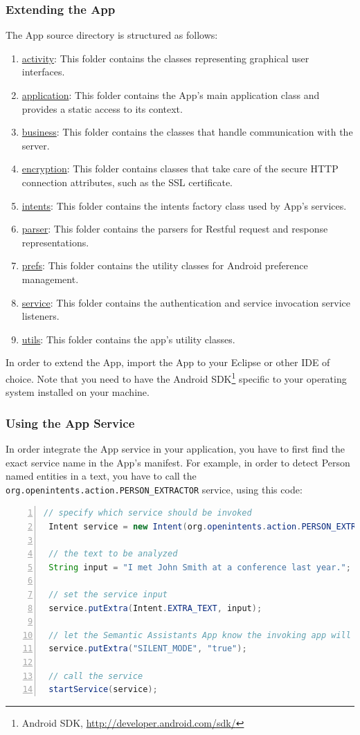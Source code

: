 \subsubsection{Extending the \sa App}
The \sa App source directory is structured as follows:
\begin{enumerate}
\item\url{activity}: This folder contains the classes representing graphical user interfaces.
\item\url{application}: This folder contains the \sa App's main application class and provides a static access to its context.
\item\url{business}: This folder contains the classes that handle communication with the \sa server.
\item\url{encryption}: This folder contains classes that take care of the secure HTTP connection attributes, such as the SSL certificate.
\item\url{intents}: This folder contains the intents factory class used by \sa App's services.
\item\url{parser}: This folder contains the parsers for Restful request and response representations.
\item\url{prefs}: This folder contains the utility classes for Android preference management.
\item\url{service}: This folder contains the authentication and service invocation service listeners.
\item\url{utils}: This folder contains the app's utility classes.
\end{enumerate}

In order to extend the \sa App, import the \sa App to your Eclipse or other IDE of choice. Note that you need to have the Android SDK\footnote{Android SDK, \url{http://developer.android.com/sdk/}} specific to your operating system installed on your machine.

\subsubsection{Using the \sa App Service}
In order integrate the \sa App service in your application, you have to first find the exact service name in the \sa App's manifest. For example, in order to detect Person named entities in a text, you have to call the \texttt{org.openintents.action.PERSON\_EXTRACTOR} service, using this code:

\begin{lstlisting}[language=Java,numbers=left,xleftmargin=4mm,columns=flexible]
 // specify which service should be invoked
 Intent service = new Intent(org.openintents.action.PERSON_EXTRACTOR);

 // the text to be analyzed
 String input = "I met John Smith at a conference last year.";

 // set the service input
 service.putExtra(Intent.EXTRA_TEXT, input);

 // let the Semantic Assistants App know the invoking app will present the results
 service.putExtra("SILENT_MODE", "true");

 // call the service
 startService(service);
\end{lstlisting}

